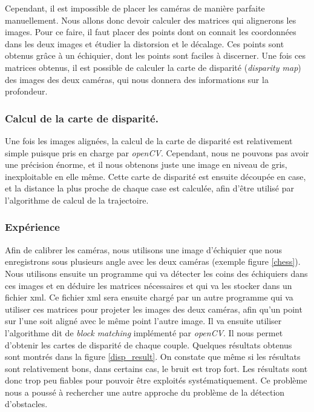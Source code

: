 \documentclass{article}
\begin{document}
Cependant, il est impossible de placer les caméras de manière parfaite manuellement. Nous allons donc devoir calculer des matrices qui alignerons les images. Pour ce faire, il faut placer des points dont on connait les coordonnées dans les deux images et étudier la distorsion et le décalage. Ces points sont obtenus grâce à un échiquier, dont les points sont faciles à discerner. Une fois ces matrices obtenus, il est possible de calculer la carte de disparité (\emph{disparity map}) des images des deux caméras, qui nous donnera des informations sur la profondeur.

\subsubsection{Calcul de la carte de disparité.}
Une fois les images alignées, la calcul de la carte de disparité est relativement simple puisque pris en charge par \emph{openCV}. Cependant, nous ne pouvons pas avoir une précision énorme, et il nous obtenons juste une image en niveau de gris, inexploitable en elle même. Cette carte de disparité est ensuite découpée en case, et la distance la plus proche de chaque case est calculée, afin d'être utilisé par l'algorithme de calcul de la trajectoire.

\subsubsection{Expérience} Afin de calibrer les caméras, nous utilisons une image d'échiquier que nous enregistrons sous plusieurs angle avec les deux caméras (exemple figure \ref{chess}). Nous utilisons ensuite un programme qui va détecter les coins des échiquiers dans ces images et en déduire les matrices nécessaires et qui va les stocker dans un fichier xml. Ce fichier xml sera ensuite chargé par un autre programme qui va utiliser ces matrices pour projeter les images des deux caméras, afin qu'un point sur l'une soit aligné avec le même point l'autre image. Il va ensuite utiliser l'algorithme dit de \emph{block matching} implémenté par \emph{openCV}. Il nous permet d'obtenir les cartes de disparité de chaque couple. Quelques résultats obtenus sont montrés dans la figure \ref{disp_result}. On constate que même si les résultats sont relativement bons, dans certains cas, le bruit est trop fort. Les résultats sont donc trop peu fiables pour pouvoir être exploités systématiquement. Ce problème nous a poussé à rechercher une autre approche du problème de la détection d'obstacles.
\end{document}
